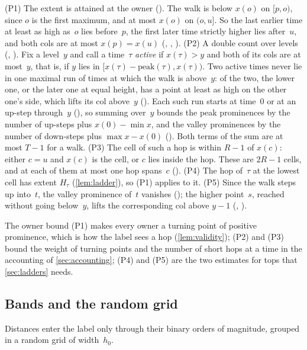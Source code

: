 \begin{outline}
(P1) The extent is attained at the owner (). The walk is below $x(o)$ on $[p,o)$, since $o$ is the
first maximum, and at most $x(o)$ on $(o,u]$. So the last earlier
time at least as high as~$o$ lies before~$p$, the first later time strictly higher lies after~$u$, and both cols are at most
$x(p)=x(u)$ (, , ). (P2) A double count over levels (, ). Fix a level~$y$ and call
a time~$\tau$ \emph{active} if $x(\tau)>y$ and both of its cols are at most~$y$, that is, if $y$ lies in
$[x(\tau)-\mathrm{peak}(\tau),x(\tau))$. Two active times never lie in one maximal run of times at which the walk is above~$y$:
of the two, the lower one, or the later one at equal height, has a point at least as high on the other one's side, which lifts
its col above~$y$ (). Each such run starts at time~$0$ or at an up-step through~$y$
(), so summing over~$y$ bounds the peak prominences by the number of up-steps plus $x(0)-\min x$, and the
valley prominences by the number of down-steps plus $\max x-x(0)$ (). Both terms of the sum are at most
$T-1$ for a walk. (P3) The cell of such a hop is within $R-1$ of $x(c)$: either $c=u$ and $x(c)$ is the cell, or $c$ lies
inside the hop. These are $2R-1$ cells, and at each of them at most one hop spans~$c$
(). (P4) The hop of~$\tau$ at the lowest cell has extent $H_\tau$ (\cref{lem:ladder}), so
(P1) applies to it. (P5) Since the walk steps up into~$t$, the valley prominence of~$t$ vanishes
(); the higher point~$s$, reached without going below~$y$, lifts the corresponding col above
$y-1$ (, ).
\end{outline}

The owner bound (P1) makes every owner a turning point of positive prominence, which is how the label sees a hop
(\cref{lem:validity}); (P2) and (P3) bound the weight of turning points and the number of short hops at a time in the
accounting of \cref{sec:accounting}; (P4) and (P5) are the two estimates for tops that \cref{sec:ladders} needs.

\subsection{Bands and the random grid}\label{sec:prelim-grid}

Distances enter the label only through their binary orders of magnitude, grouped in a random grid of width~$h_0$.

